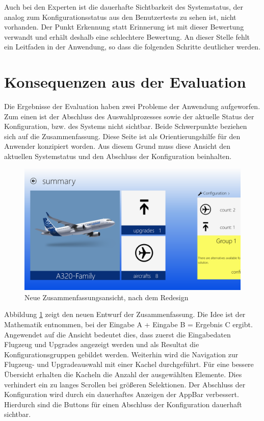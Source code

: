Auch bei den Experten ist die dauerhafte Sichtbarkeit des Systemstatus, der analog zum Konfigurationsstatus aus den Benutzertests zu sehen ist, nicht vorhanden. Der Punkt Erkennung statt Erinnerung ist mit dieser Bewertung verwandt und erhält deshalb eine schlechtere Bewertung.  An dieser Stelle fehlt ein Leitfaden in der Anwendung, so dass die folgenden Schritte deutlicher werden. 

\section{Konsequenzen aus der Evaluation}
Die Ergebnisse der Evaluation haben zwei Probleme der Anwendung aufgeworfen. Zum einen ist der Abschluss des Auswahlprozesses sowie der aktuelle Status der Konfiguration, bzw. des Systems nicht sichtbar. Beide Schwerpunkte beziehen sich auf die Zusammenfassung. Diese Seite ist als Orientierungshilfe für den Anwender konzipiert worden. Aus diesem Grund muss diese Ansicht den aktuellen Systemstatus und den Abschluss der Konfiguration beinhalten.  
\begin{figure}[H]
\includegraphics[width=\hsize]{images/impl/summary_impl}
\caption{Neue Zusammenfassungsansicht, nach dem Redesign}
\label{redesignSummary}
\end{figure}
Abbildung \ref{redesignSummary} zeigt den neuen Entwurf der Zusammenfassung. Die Idee ist der Mathematik entnommen, bei der Eingabe A + Eingabe B = Ergebnis C ergibt. Angewendet auf die Ansicht bedeutet dies, dass zuerst die Eingabedaten Flugzeug und Upgrades angezeigt werden und als Resultat die Konfigurationsgruppen gebildet werden. Weiterhin wird die Navigation zur Flugzeug- und Upgradeauswahl mit einer Kachel durchgeführt. Für eine bessere Übersicht erhalten die Kacheln die Anzahl der ausgewählten Elemente. Dies verhindert ein zu langes Scrollen bei größeren Selektionen. 
Der Abschluss der Konfiguration wird durch ein dauerhaftes Anzeigen der AppBar verbessert. Hierdurch sind die Buttons für einen Abschluss der Konfiguration dauerhaft sichtbar.
